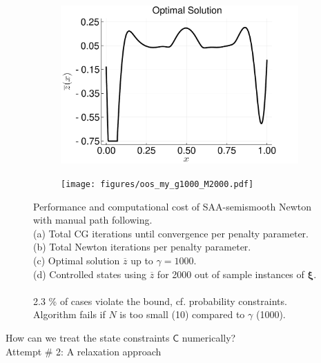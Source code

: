 \documentclass[aspectratio=169,xcolor=dvipsnames,11pt]{beamer}
\newcommand{\setC}{\mathsf{C}}
\begin{document}
\begin{footnotesize}
\begin{frame}
\begin{figure}
\begin{subfigure}[b]{0.25\linewidth}
         \centering
          \includegraphics[width=\linewidth]{figures/z_my_1000.pdf}
         \caption{}
         \label{fig:opt-ctrl}
     \end{subfigure}\hfill
     \begin{subfigure}[b]{0.25\linewidth}
     \centering
     \texttt{[image: figures/oos\_my\_g1000\_M2000.pdf]}
     \caption{}
     \label{fig:oos-states}
 	\end{subfigure}\hfill
        \caption{Performance and computational cost of SAA-semismooth Newton with manual path following.\\
          (a) Total CG iterations until convergence per penalty parameter. \\ (b) Total Newton iterations per penalty parameter. \\
  (c) Optimal solution $\overline{z}$ up to $\gamma = 1000$. \\ (d) Controlled states using $\overline{z}$ for 2000 out of sample instances of $\bm\xi$.\\
 \phantom{A} \\ 
  2.3 \% of cases violate the bound, cf. probability constraints.\\ Algorithm fails if $N$ is too small (10) compared to $\gamma$ (1000).}
        \label{fig:saa-ssn}
\end{figure}
\end{frame}

\begin{frame}[noframenumbering]\thispagestyle{empty}
\vspace*{\fill}
\begin{center}
\Large 
How can we treat the state constraints $\setC$ numerically?\\
\pause
Attempt \# 2: A relaxation approach
\end{center}
\vspace*{\fill}
\end{frame}


\end{footnotesize}
\end{document}
